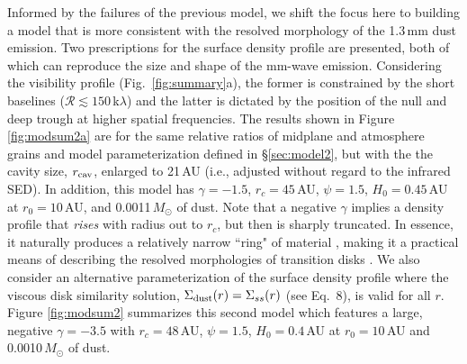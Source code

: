 {Informed by the failures of the previous model, we shift the focus here to
building a model that is more consistent with the resolved morphology of the 
1.3\,mm dust emission.  Two prescriptions for the surface density profile are 
presented, both of which can reproduce the size and shape of the mm-wave 
emission.  Considering the visibility profile (Fig.~\ref{fig:summary}a), the former 
is constrained by the short baselines 
($\mathcal{R}\lesssim150$\,k$\lambda$) and the latter is dictated by the 
position of the null and deep trough at higher spatial frequencies.  The results
shown in Figure \ref{fig:modsum2a} are for the same relative ratios of midplane 
and atmosphere grains and model parameterization defined in \S\ref{sec:model2}, 
but with the the cavity size, $r_{\rm cav}$, enlarged to 21\,AU (i.e., adjusted
without regard to the infrared SED).  In addition, 
this model has $\gamma=-1.5$, $r_c=45$\,AU, $\psi = 1.5$, 
$H_0 = 0.45$\,AU at $r_0 = 10$\,AU, and 0.0011\,$M_\odot$ of dust.  Note that a 
negative $\gamma$ implies a density profile that {\it rises} with 
radius out to $r_c$, but then is sharply truncated.  In essence, it naturally
produces a relatively narrow ``ring" of material \citep{isella09}, making it a
practical means of describing the resolved morphologies of transition disks 
\citep[e.g.,][]{isella10,isella12,andrews11b,brown12}.  We also 
consider an alternative parameterization of the surface density profile where 
the viscous disk similarity solution, $\Sigma_{\rm dust}(r) = \Sigma_{ss}(r)$ 
(see Eq.~8), is valid for all $r$. Figure \ref{fig:modsum2} summarizes this 
second model which features a large, negative $\gamma = -3.5$ with 
$r_c = 48$\,AU, $\psi = 1.5$, $H_0 = 0.4$\,AU at $r_0 = 10$\,AU and 
0.0010\,$M_\odot$ of dust.

}
